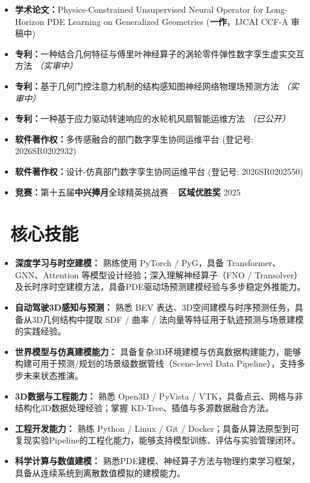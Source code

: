 \documentclass[11pt]{article}
\begin{document}
\begin{itemize}
    \item \textbf{学术论文：}Physics-Constrained Unsupervised Neural Operator for Long-Horizon PDE Learning on Generalized Geometries (\textbf{一作}，IJCAI CCF-A 审稿中)
    \item \textbf{专利：}一种结合几何特征与傅里叶神经算子的涡轮零件弹性数字孪生虚实交互方法 \textit{（实审中）}
    \item \textbf{专利：}基于几何门控注意力机制的结构感知图神经网络物理场预测方法 \textit{（实审中）}
    \item \textbf{专利：}一种基于应力驱动转速响应的水轮机风扇智能运维方法 \textit{（已公开）}
    \item \textbf{软件著作权：}多传感融合的部门数字孪生协同运维平台 (登记号: 2026SR0202932)
    \item \textbf{软件著作权：}设计-仿真部门数字孪生协同运维平台 (登记号: 2026SR0202550)
    \item \textbf{竞赛：}第十五届\textbf{中兴捧月}全球精英挑战赛 -- \textbf{区域优胜奖} \hfill 2025
\end{itemize}

  
\section{\makebox[\widthof{\faCogs}][c]{\color{CVBlue}\faCogs}\ 核心技能}
\begin{itemize}
    \item \textbf{深度学习与时空建模：} 熟练使用 PyTorch / PyG，具备 Transformer、GNN、Attention 等模型设计经验；深入理解神经算子（FNO / Transolver）及长时序时空建模方法，具备PDE驱动场预测建模经验与多步稳定外推能力。
    \item \textbf{自动驾驶3D感知与预测：} 熟悉 BEV 表达、3D空间建模与时序预测任务，具备从3D几何结构中提取 SDF / 曲率 / 法向量等特征用于轨迹预测与场景建模的实践经验。
    \item \textbf{世界模型与仿真建模能力：} 具备复杂3D环境建模与仿真数据构建能力，能够构建可用于预测/规划的场景级数据管线（Scene-level Data Pipeline），支持多步未来状态推演。
    \item \textbf{3D数据与工程能力：} 熟悉 Open3D / PyVista / VTK，具备点云、网格与非结构化3D数据处理经验；掌握 KD-Tree、插值与多源数据融合方法。
    \item \textbf{工程开发能力：} 熟练 Python / Linux / Git / Docker；具备从算法原型到可复现实验Pipeline的工程化能力，能够支持模型训练、评估与实验管理闭环。
    \item \textbf{科学计算与数值建模：} 熟悉PDE建模、神经算子方法与物理约束学习框架，具备从连续系统到离散数值模拟的建模能力。
\end{itemize}
\end{document}
